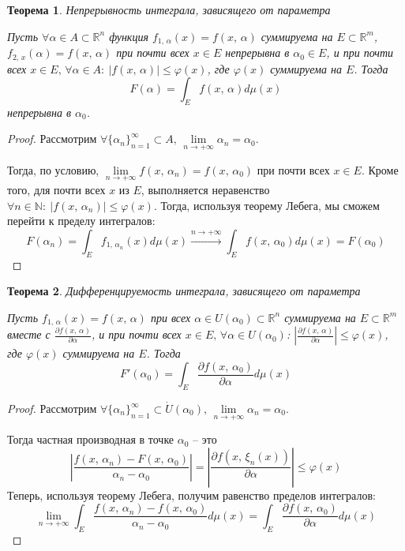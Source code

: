 \documentclass[a4paper,12pt]{article}
\renewcommand{\phi}{\ensuremath{\varphi}}
\renewcommand{\leq}{\ensuremath{\leqslant}}
\theoremstyle{plain}
\newtheorem{theorem}{Теорема}[section]
\theoremstyle{definition}
\theoremstyle{remark}
\begin{document}
\begin{theorem}
	Непрерывность интеграла, зависящего от параметра

	Пусть $\forall \alpha \in A \subset \mathbb{R}^n$ функция $f_{1,\,\alpha}(x) = f(x,\,\alpha)$ суммируема на $E \subset \mathbb{R}^m$, $f_{2,\,x}(\alpha) = f(x,\,\alpha)$ при почти всех $x \in E$ непрерывна в $\alpha_0 \in E$, и при почти всех $x \in E,\, \forall \alpha \in A :\: |f(x,\,\alpha)| \leq \phi(x)$, где $\phi(x)$ суммируема на $E$. Тогда
	\[F(\alpha) = \int_E f(x,\, \alpha)d\mu(x)\]
	непрерывна в $\alpha_0$.
\end{theorem}

\begin{proof}
	Рассмотрим $\forall \{\alpha_n\}_{n = 1}^\infty \subset A,\, \lim\limits_{n\to +\infty}\alpha_n = \alpha_0$.

	Тогда, по условию, $\lim\limits_{n \to +\infty} f(x,\,\alpha_n) = f(x,\,\alpha_0)$ при почти всех $x \in E$. Кроме того, для почти всех $x$ из $E$, выполняется неравенство $\forall n \in \mathbb{N}:\: |f(x,\,\alpha_n)| \leq \phi(x)$. Тогда, используя теорему Лебега, мы сможем перейти к пределу интегралов:
	\[F(\alpha_n) = \int_E f_{1,\, \alpha_n}(x)d\mu(x) \stackrel{n \to +\infty}{\to} \int_E f(x,\,\alpha_0)d\mu(x) = F(\alpha_0)\]
\end{proof}

\begin{theorem}
	Дифференцируемость интеграла, зависящего от параметра

	Пусть $f_{1,\,\alpha}(x) = f(x,\,\alpha)$ при всех $\alpha \in U(\alpha_0) \subset \mathbb{R}^n$ суммируема на $E \subset \mathbb{R}^m$ вместе с $\frac{\partial f(x,\,\alpha)}{\partial \alpha}$, и при почти всех $x \in E,\, \forall \alpha \in U(\alpha_0)$: $\left|\frac{\partial f(x,\,\alpha)}{\partial \alpha}\right| \leq \phi(x)$, где $\phi(x)$ суммируема на $E$. Тогда
	\[F'(\alpha_0) = \int_E \frac{\partial f(x,\,\alpha_0)}{\partial \alpha}d\mu(x)\]
\end{theorem}

\begin{proof}
	Рассмотрим $\forall \{\alpha_n\}_{n = 1}^\infty \subset \dot{U}(\alpha_0),\, \lim\limits_{n \to +\infty}\alpha_n = \alpha_0$.

	Тогда частная производная в точке $\alpha_0$ -- это
	\[\left|\frac{f(x,\,\alpha_n) - F(x,\,\alpha_0)}{\alpha_n - \alpha_0}\right| = \left|\frac{\partial f(x,\,\xi_n(x))}{\partial \alpha}\right| \leq \phi(x)\]
	Теперь, используя теорему Лебега, получим равенство пределов интегралов:
	\[\lim_{n \to +\infty}\int_E \frac{f(x,\,\alpha_n) - f(x,\,\alpha_0)}{\alpha_n - \alpha_0}d\mu(x) = \int_E \frac{\partial f(x,\,\alpha_0)}{\partial	\alpha}d\mu(x)\]
\end{proof}
\end{document}
